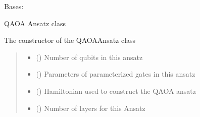\documentclass[letterpaper,10pt,english]{sphinxmanual}
\begin{document}
\begin{fulllineitems}
\label{\detokenize{qcompute_qapp.circuit:qcompute_qapp.circuit.QAOAAnsatz}}
\pysigstartsignatures
{}
\pysigstopsignatures
\sphinxAtStartPar
Bases: {\hyperref[\detokenize{qcompute_qapp.circuit:qcompute_qapp.circuit.ParameterizedCircuit}]{}}

\sphinxAtStartPar
QAOA Ansatz class

\sphinxAtStartPar
The constructor of the QAOAAnsatz class
\begin{quote}\begin{description}
\begin{itemize}
\item {} 
\sphinxAtStartPar
{} () \textendash{} Number of qubits in this ansatz

\item {} 
\sphinxAtStartPar
{} () \textendash{} Parameters of parameterized gates in this ansatz

\item {} 
\sphinxAtStartPar
{} () \textendash{} Hamiltonian used to construct the QAOA ansatz

\item {} 
\sphinxAtStartPar
{} () \textendash{} Number of layers for this Ansatz

\end{itemize}

\end{description}\end{quote}


\end{fulllineitems}
\end{document}
